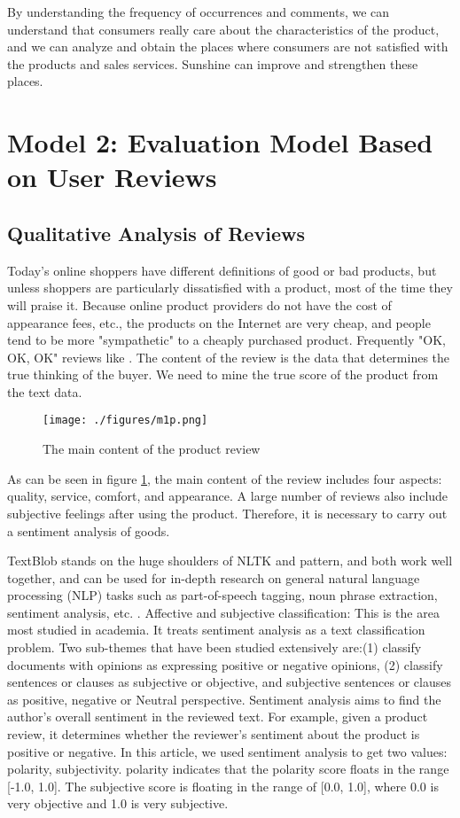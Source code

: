 \documentclass[UTF8]{article}
\newcommand{\upcite}[1]{\textsuperscript{\textsuperscript{\cite{#1}}}}
\begin{document}
By understanding the frequency of occurrences and comments, we can understand that consumers really care about the characteristics of the product, and we can analyze and obtain the places where consumers are not satisfied with the products and sales services. Sunshine can improve and strengthen these places.

\section{Model 2: Evaluation Model Based on User Reviews}

\subsection{Qualitative Analysis of Reviews}

Today's online shoppers have different definitions of good or bad products, but unless shoppers are particularly dissatisfied with a product, most of the time they will praise it. Because online product providers do not have the cost of appearance fees, etc., the products on the Internet are very cheap, and people tend to be more "sympathetic" to a cheaply purchased product. Frequently "OK, OK, OK" reviews like \upcite{zz}. The content of the review is the data that determines the true thinking of the buyer. We need to mine the true score of the product from the text data.

\begin{figure}[h]
	\centering
	\texttt{[image: ./figures/m1p.png]}
	\caption{The main content of the product review} \label{m1p}
\end{figure}

As can be seen in figure \ref{m1p}, the main content of the review includes four aspects: quality, service, comfort, and appearance. A large number of reviews also include subjective feelings after using the product. Therefore, it is necessary to carry out a sentiment analysis of goods.

TextBlob stands on the huge shoulders of NLTK and pattern, and both work well together, and can be used for in-depth research on general natural language processing (NLP) tasks such as part-of-speech tagging, noun phrase extraction, sentiment analysis, etc. \upcite{Martinc2015Efficient }. Affective and subjective classification: This is the area most studied in academia. It treats sentiment analysis as a text classification problem. Two sub-themes that have been studied extensively are:(1) classify documents with opinions as expressing positive or negative opinions, (2) classify sentences or clauses as subjective or objective, and subjective sentences or clauses as positive, negative or Neutral perspective. Sentiment analysis aims to find the author's overall sentiment in the reviewed text. For example, given a product review, it determines whether the reviewer's sentiment about the product is positive or negative. In this article, we used sentiment analysis to get two values: polarity, subjectivity. polarity indicates that the polarity score floats in the range [-1.0, 1.0]. The subjective score is floating in the range of [0.0, 1.0], where 0.0 is very objective and 1.0 is very subjective.
\end{document}
